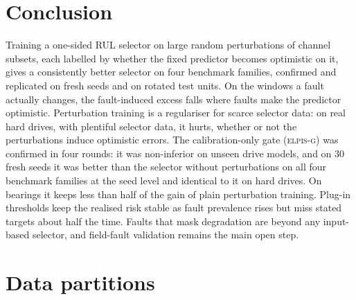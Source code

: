 \documentclass{esannV2}
\newcommand{\AUTOD}{\textsc{elpis-g}}
\begin{document}
\section{Conclusion}
Training a one-sided RUL selector on large random perturbations of channel subsets, each labelled by whether the fixed predictor becomes optimistic on it, gives a consistently better selector on four benchmark families, confirmed and replicated on fresh seeds and on rotated test units. On the windows a fault actually changes, the fault-induced excess falls where faults make the predictor optimistic. Perturbation training is a regulariser for scarce selector data: on real hard drives, with plentiful selector data, it hurts, whether or not the perturbations induce optimistic errors. The calibration-only gate (\AUTOD) was confirmed in four rounds: it was non-inferior on unseen drive models, and on 30 fresh seeds it was better than the selector without perturbations on all four benchmark families at the seed level and identical to it on hard drives. On bearings it keeps less than half of the gain of plain perturbation training. Plug-in thresholds keep the realised risk stable as fault prevalence rises but miss stated targets about half the time. Faults that mask degradation are beyond any input-based selector, and field-fault validation remains the main open step.


\FloatBarrier
\section{Data partitions}\label{app:splits}
\begin{table}[!htbp]
\caption{Units per partition for one seed (72; other seeds re-shuffle the same pools). C-MAPSS uses the official training engines only (50/10/15/10/15\%); the other families keep their official or condition-based evaluation units and split the remaining units into fit, validation, selector and calibration sets.}
\label{tab:splits}
\centering\footnotesize
\setlength{\tabcolsep}{3.5pt}
\end{table}
\end{document}
